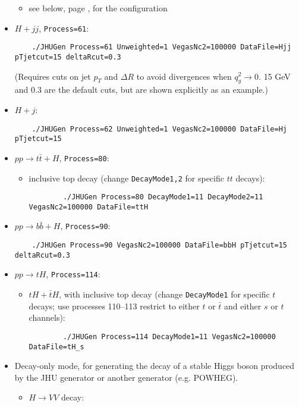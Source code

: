 \documentclass[aps,superscriptaddress,nofootinbib]{revtex4}
\begin{document}
\begin{itemize}
\begin{itemize}
		\item see below, page \pageref{sec:offshellVBF}, for the configuration
	\end{itemize}
	\item $H+jj$, \texttt{Process=61}:
	\begin{verbatim}
	./JHUGen Process=61 Unweighted=1 VegasNc2=100000 DataFile=Hjj pTjetcut=15 deltaRcut=0.3
	\end{verbatim}
	(Requires cuts on jet $p_T$ and $\Delta R$ to avoid divergences when $q_g^2\to 0$.  15 GeV and 0.3 are the default cuts, but are shown explicitly as an example.)
	\item $H+j$:
	\begin{verbatim}
	./JHUGen Process=62 Unweighted=1 VegasNc2=100000 DataFile=Hj pTjetcut=15
	\end{verbatim}
	\item $pp \to t\bar{t}+H$, \texttt{Process=80}:
	\begin{itemize}
		\item inclusive top decay (change \verb|DecayMode1,2| for specific $tt$ decays):
		\begin{verbatim}
		./JHUGen Process=80 DecayMode1=11 DecayMode2=11 VegasNc2=100000 DataFile=ttH
		\end{verbatim}
	\end{itemize}
	\item $pp \to b\bar{b}+H$, \texttt{Process=90}:
	\begin{verbatim}
	./JHUGen Process=90 VegasNc2=100000 DataFile=bbH pTjetcut=15 deltaRcut=0.3
	\end{verbatim}
	\item $pp \to tH$, \texttt{Process=114}:
	\begin{itemize}
		\item $tH+\bar{t}H$, with inclusive top decay (change \verb|DecayMode1| for specific $t$ decays; use processes 110--113 restrict to either $t$ or $\bar{t}$ and either $s$ or $t$ channels):
		\begin{verbatim}
		./JHUGen Process=114 DecayMode1=11 VegasNc2=100000 DataFile=tH_s
		\end{verbatim}
	\end{itemize}
	\item Decay-only mode, for generating the decay of a stable Higgs boson produced by the JHU generator or another generator (e.g. POWHEG).
	\begin{itemize}
		\item $H\to VV$ decay:
		\begin{verbatim}

\end{verbatim}
\end{itemize}
\end{itemize}
\end{document}

